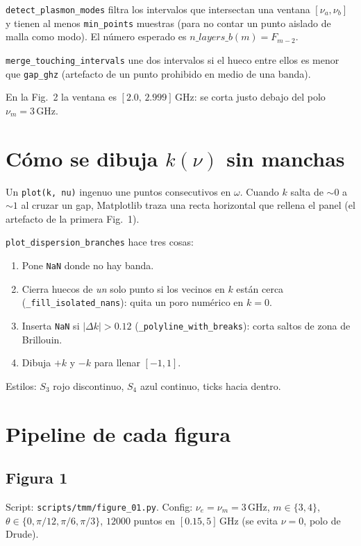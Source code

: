 \documentclass[11pt,a4paper]{article}
\begin{document}
\texttt{detect\_plasmon\_modes} filtra los intervalos que intersectan una
ventana \([\nu_a,\nu_b]\) y tienen al menos \texttt{min\_points} muestras
(para no contar un punto aislado de malla como modo).
El número esperado es \(n\_layers\_b(m)=F_{m-2}\).

\texttt{merge\_touching\_intervals} une dos intervalos si el hueco entre ellos
es menor que \texttt{gap\_ghz} (artefacto de un punto prohibido en medio de
una banda).

En la Fig.~2 la ventana es \([2.0,\,2.999]\,\mathrm{GHz}\): se corta justo
debajo del polo \(\nu_m=3\,\mathrm{GHz}\).

\section{Cómo se dibuja \(k(\nu)\) sin manchas}

Un \texttt{plot(k, nu)} ingenuo une puntos consecutivos en \(\omega\).
Cuando \(k\) salta de \(\sim 0\) a \(\sim 1\) al cruzar un gap, Matplotlib
traza una recta horizontal que rellena el panel (el artefacto de la primera
Fig.~1).

\texttt{plot\_dispersion\_branches} hace tres cosas:

\begin{enumerate}
\item Pone \texttt{NaN} donde no hay banda.
\item Cierra huecos de \emph{un} solo punto si los vecinos en \(k\) están
cerca (\texttt{\_fill\_isolated\_nans}): quita un poro numérico en \(k=0\).
\item Inserta \texttt{NaN} si \(\lvert\Delta k\rvert>0.12\)
(\texttt{\_polyline\_with\_breaks}): corta saltos de zona de Brillouin.
\item Dibuja \(+k\) y \(-k\) para llenar \([-1,1]\).
\end{enumerate}

Estilos: \(S_3\) rojo discontinuo, \(S_4\) azul continuo, ticks hacia dentro.

\section{Pipeline de cada figura}

\subsection{Figura 1}

Script: \texttt{scripts/tmm/figure\_01.py}.
Config: \(\nu_e=\nu_m=3\,\mathrm{GHz}\), \(m\in\{3,4\}\),
\(\theta\in\{0,\pi/12,\pi/6,\pi/3\}\),
\(12000\) puntos en \([0.15,5]\,\mathrm{GHz}\) (se evita \(\nu=0\), polo de
Drude).
\end{document}
